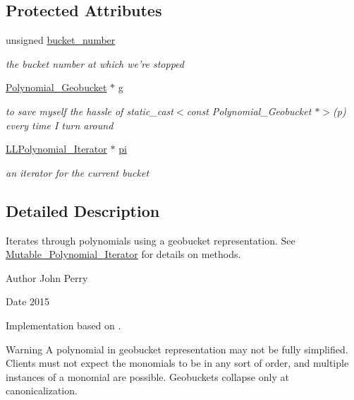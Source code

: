 \subsection*{Protected Attributes}
\begin{DoxyCompactItemize}
\item 
\mbox{\label{class_geobucket___iterator_a3a32af8a6cb4d462a3b325721bd2a11b}} 
unsigned \hyperlink{class_geobucket___iterator_a3a32af8a6cb4d462a3b325721bd2a11b}{bucket\+\_\+number}
\begin{DoxyCompactList}\small\item\em the bucket number at which we're stopped \end{DoxyCompactList}\item 
\mbox{\label{class_geobucket___iterator_a17836580130b78ffc1fb62b9bf67c286}} 
\hyperlink{class_polynomial___geobucket}{Polynomial\+\_\+\+Geobucket} $\ast$ \hyperlink{class_geobucket___iterator_a17836580130b78ffc1fb62b9bf67c286}{g}
\begin{DoxyCompactList}\small\item\em to save myself the hassle of {\ttfamily static\+\_\+cast$<$const Polynomial\+\_\+\+Geobucket $\ast$$>$(p)} every time I turn around \end{DoxyCompactList}\item 
\mbox{\label{class_geobucket___iterator_a484bb97ad82643d5b82733f6cbee8e8c}} 
\hyperlink{class_l_l_polynomial___iterator}{L\+L\+Polynomial\+\_\+\+Iterator} $\ast$ \hyperlink{class_geobucket___iterator_a484bb97ad82643d5b82733f6cbee8e8c}{pi}
\begin{DoxyCompactList}\small\item\em an iterator for the current bucket \end{DoxyCompactList}\end{DoxyCompactItemize}


\subsection{Detailed Description}
Iterates through polynomials using a geobucket representation. See \hyperlink{class_mutable___polynomial___iterator}{Mutable\+\_\+\+Polynomial\+\_\+\+Iterator} for details on methods. 

\begin{DoxyAuthor}{Author}
John Perry 
\end{DoxyAuthor}
\begin{DoxyDate}{Date}
2015
\end{DoxyDate}
Implementation based on \cite{YanGeobuckets}. \begin{DoxyWarning}{Warning}
A polynomial in geobucket representation may not be fully simplified. Clients must not expect the monomials to be in any sort of order, and multiple instances of a monomial are possible. Geobuckets collapse only at canonicalization. 
\end{DoxyWarning}


